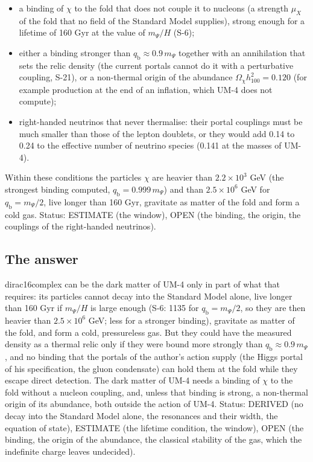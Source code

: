 \documentclass[
  10pt,
]{article}
\providecommand{\tightlist}{%
  \setlength{\itemsep}{0pt}\setlength{\parskip}{0pt}}
\begin{document}
\begin{itemize}
\tightlist
\item
  a binding of \(\chi\) to the fold that does not couple it to nucleons
  (a strength \(\mu_X\) of the fold that no field of the Standard Model
  supplies), strong enough for a lifetime of 160 Gyr at the value of
  \(m_\Psi/H\) (S-6);
\item
  either a binding stronger than \(q_{\mathrm{b}} \approx 0.9\,m_\Psi\)
  together with an annihilation that sets the relic density (the current
  portals cannot do it with a perturbative coupling, S-21), or a
  non-thermal origin of the abundance \(\Omega_\chi h_{100}^2 = 0.120\)
  (for example production at the end of an inflation, which UM-4 does
  not compute);
\item
  right-handed neutrinos that never thermalise: their portal couplings
  must be much smaller than those of the lepton doublets, or they would
  add 0.14 to 0.24 to the effective number of neutrino species (0.141 at
  the masses of UM-4).
\end{itemize}

Within these conditions the particles \(\chi\) are heavier than
\(2.2\times10^3\) GeV (the strongest binding computed,
\(q_{\mathrm{b}} = 0.999\,m_\Psi\)) and than \(2.5\times10^6\) GeV for
\(q_{\mathrm{b}} = m_\Psi/2\), live longer than 160 Gyr, gravitate as
matter of the fold and form a cold gas. Status: ESTIMATE (the window),
OPEN (the binding, the origin, the couplings of the right-handed
neutrinos).

\hypertarget{the-answer-1}{%
\subsection{The answer}\label{the-answer-1}}

dirac16complex can be the dark matter of UM-4 only in part of what that
requires: its particles cannot decay into the Standard Model alone, live
longer than 160 Gyr if \(m_\Psi/H\) is large enough (S-6: 1135 for
\(q_{\mathrm{b}} = m_\Psi/2\), so they are then heavier than
\(2.5\times10^6\) GeV; less for a stronger binding), gravitate as matter
of the fold, and form a cold, pressureless gas. But they could have the
measured density as a thermal relic only if they were bound more
strongly than \(q_{\mathrm{b}} \approx 0.9\,m_\Psi\), and no binding
that the portals of the author's action supply (the Higgs portal of his
specification, the gluon condensate) can hold them at the fold while
they escape direct detection. The dark matter of UM-4 needs a binding of
\(\chi\) to the fold without a nucleon coupling, and, unless that
binding is strong, a non-thermal origin of its abundance, both outside
the action of UM-4. Status: DERIVED (no decay into the Standard Model
alone, the resonances and their width, the equation of state), ESTIMATE
(the lifetime condition, the window), OPEN (the binding, the origin of
the abundance, the classical stability of the gas, which the indefinite
charge leaves undecided).
\end{document}
